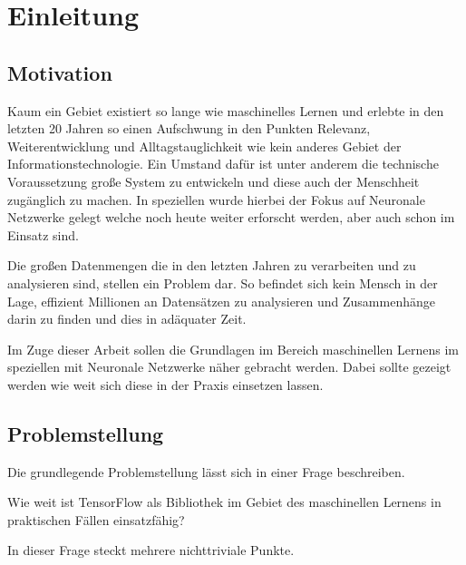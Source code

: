 \chapter{Einleitung}
\label{cha:Einleitung}

\section{Motivation}

Kaum ein Gebiet existiert so lange wie maschinelles Lernen und erlebte in den letzten 20 Jahren so einen Aufschwung in den Punkten Relevanz, Weiterentwicklung und Alltagstauglichkeit wie kein anderes Gebiet der Informationstechnologie. 
Ein Umstand dafür ist unter anderem die technische Voraussetzung große System zu entwickeln und diese auch der Menschheit zugänglich zu machen. 
In speziellen wurde hierbei der Fokus auf Neuronale Netzwerke gelegt welche noch heute weiter erforscht werden, aber auch schon im Einsatz sind. \newline

\noindent
Die großen Datenmengen die in den letzten Jahren zu verarbeiten und zu analysieren sind, stellen ein Problem dar. 
So befindet sich kein Mensch in der Lage, effizient Millionen an Datensätzen zu analysieren und Zusammenhänge darin zu finden und dies in adäquater Zeit. \newline

\noindent
Im Zuge dieser Arbeit sollen die Grundlagen im Bereich maschinellen Lernens im speziellen mit Neuronale Netzwerke näher gebracht werden. 
Dabei sollte gezeigt werden wie weit sich diese in der Praxis einsetzen lassen. 

\section{Problemstellung}

Die grundlegende Problemstellung lässt sich in einer Frage beschreiben. \newline

Wie weit ist TensorFlow als Bibliothek im Gebiet des maschinellen Lernens in praktischen Fällen einsatzfähig? \newline

\noindent
In dieser Frage steckt mehrere nichttriviale Punkte. 

